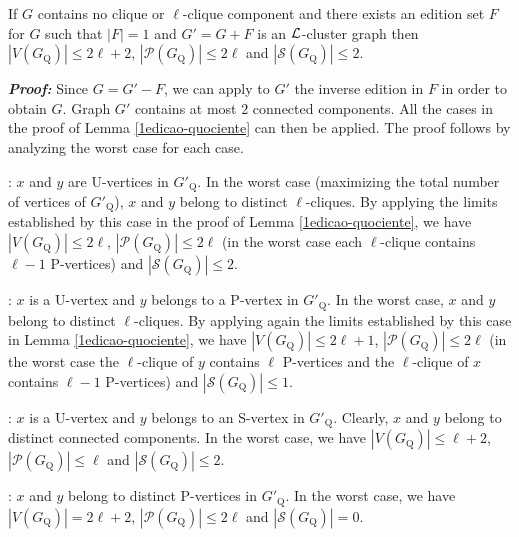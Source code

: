 \documentclass[12pt]{article}
\def\L{{\cal L}}
\begin{document}
\begin{lema} \label{kernel1mod}
If $G$ contains no clique or $\ell$-clique component and there
exists an edition set $F$ for $G$ such that $|F|=1$ and
$G'=G+F$ is an $\L$-cluster graph then $|V(G_{\mathrm Q})|
\leq 2 \ell + 2$, $|{\mathcal P}(G_{\mathrm Q})| \leq 2 \ell$ and
$|{\mathcal S}(G_{\mathrm Q})| \leq 2$.
\end{lema}


\emph{\textbf{Proof:}} Since $G = G'-F$, we can apply to $G'$ the inverse
edition in $F$ in order to obtain $G$. Graph $G'$
contains at most $2$ connected components. All the cases in the
proof of Lemma \ref{1edicao-quociente} can then be applied.
The proof follows by analyzing the worst case for each case.

\medskip

: $x$ and $y$ are U-vertices in $G'_{\mathrm Q}$. In the worst case (maximizing the total number of vertices of $G'_{\mathrm Q}$), $x$ and $y$ belong to distinct $\ell$-cliques. By applying the limits established by this case in the proof of Lemma \ref{1edicao-quociente}, we have  $|V(G_{\mathrm Q})| \leq 2\ell $,  $|{\mathcal P}(G_{\mathrm Q})| \leq 2\ell$  (in the worst case each $\ell$-clique contains $\ell -1$ P-vertices) and $|{\mathcal S}(G_{\mathrm Q})| \leq 2$.

\medskip

: $x$ is a U-vertex and $y$ belongs to a P-vertex in $G'_{\mathrm Q}$. In the worst case, $x$ and $y$ belong to distinct $\ell$-cliques. By applying again the limits established by this case in Lemma \ref{1edicao-quociente}, we have $|V(G_{\mathrm Q})| \leq 2\ell +1$, $|{\mathcal P}(G_{\mathrm Q})| \leq 2\ell$ (in the worst case the $\ell$-clique of $y$ contains $\ell$ P-vertices and the $\ell$-clique of $x$ contains $\ell -1$ P-vertices) and $|{\mathcal S}(G_{\mathrm Q})| \leq 1$.

\medskip

: $x$ is a U-vertex and $y$ belongs to an S-vertex in $G'_{\mathrm Q}$. Clearly, $x$ and $y$ belong to distinct connected components. In the worst case, we have $|V(G_{\mathrm Q})| \leq \ell +2$, $|{\mathcal P}(G_{\mathrm Q})| \leq \ell$ and $|{\mathcal S}(G_{\mathrm Q})| \leq 2$.

\medskip

: $x$ and $y$ belong to distinct P-vertices in $G'_{\mathrm Q}$. In the worst case, we have $|V(G_{\mathrm Q})| = 2\ell +2$, $|{\mathcal P}(G_{\mathrm Q})| \leq 2\ell$ and $|{\mathcal S}(G_{\mathrm Q})| =0$.
\end{document}
